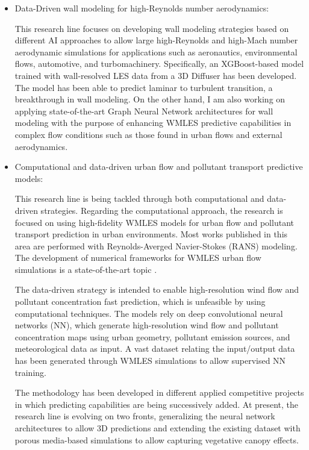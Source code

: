 \documentclass{article}
\begin{document}
\begin{itemize}

\item Data-Driven wall modeling for high-Reynolds number aerodynamics:

This research line focuses on developing wall modeling strategies based on different AI approaches to allow large high-Reynolds and high-Mach number aerodynamic simulations for applications such as aeronautics, environmental flows, automotive, and turbomachinery. Specifically, an XGBoost-based model trained with wall-resolved LES data from a 3D Diffuser has been developed. The model has been able to predict laminar to turbulent transition, a breakthrough in wall modeling. On the other hand, I am also working on applying state-of-the-art Graph Neural Network architectures for wall modeling with the purpose of enhancing WMLES predictive capabilities in complex flow conditions such as those found in urban flows and external aerodynamics.  


\item Computational and data-driven urban flow and pollutant transport predictive models: 

This research line is being tackled through both computational and data-driven strategies. Regarding the computational approach, the research is focused on using high-fidelity WMLES models for urban flow and pollutant transport prediction in urban environments. Most works published in this area are performed with Reynolds-Averged Navier-Stokes (RANS) modeling. The development of numerical frameworks for WMLES urban flow simulations is a state-of-the-art topic \cite{TOP17}. 

The data-driven strategy is intended to enable high-resolution wind flow \cite{MOK21,HOI22} and pollutant concentration fast prediction, which is unfeasible by using computational techniques. The models rely on deep convolutional neural networks (NN), which generate high-resolution wind flow and pollutant concentration maps using urban geometry, pollutant emission sources, and meteorological data as input. A vast dataset relating the input/output data has been generated through WMLES simulations to allow supervised NN training. 

The methodology has been developed in different applied competitive projects in which predicting capabilities are being successively added. At present, the research line is evolving on two fronts, generalizing the neural network architectures to allow 3D predictions and extending the existing dataset with porous media-based simulations to allow capturing vegetative canopy effects.


\end{itemize}
\end{document}
